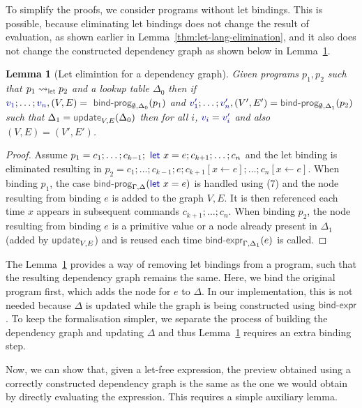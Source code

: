 \documentclass[acmsmall,anonymous,fleqn]{acmart}\settopmatter{printfolios=false,printccs=false,printacmref=false}
\newcounter{thc}
\theoremstyle{plain}
\newtheorem{lem}[thc]{Lemma}
\theoremstyle{definition}
\newcommand{\ident}[1]{\textnormal{\textcolor{idclr}{\sffamily #1}}}
\newcommand{\kvd}[1]{\textnormal{\textcolor{kvdclr}{\sffamily #1}}}
\newcommand{\bndclr}[1]{\textcolor{kvdclr}{#1}}
\begin{document}
To simplify the proofs, we consider programs without let bindings. This is possible, because
eliminating let bindings does not change the result of evaluation, as shown earlier in
Lemma~\ref{thm:let-lang-elimination}, and it also does not change the constructed dependency graph
as shown below in Lemma~\ref{thm:let-grp-elimination}.

\begin{lem}[Let elimintion for a dependency graph]
\label{thm:let-grp-elimination}
Given programs $p_1, p_2$ such that $p_1 \rightsquigarrow_\ident{let} p_2$ and a lookup table
$\Delta_0$ then if $\bndclr{v_1}; \ldots; \bndclr{v_n}, (V, E) = \ident{bind-prog}_{\emptyset, \Delta_0}(p_1)$ and
$\bndclr{v'_1};\ldots;\bndclr{v'_n}, (V', E') = \ident{bind-prog}_{\emptyset, \Delta_1}(p_2)$ such that $\Delta_1 = \ident{update}_{V, E}(\Delta_0)$
then for all $i$, $\bndclr{v_i} = \bndclr{v'_i}$ and also $(V, E) = (V', E')$.
\end{lem}
\begin{proof}
Assume $p_1 = c_1; \ldots; c_{k-1}; \kvd{let}~x=e; c_{k+1};\ldots; c_n$ and the let binding is
eliminated resulting in $p_2 = c_1; \ldots; c_{k-1}; e; c_{k+1}[x\leftarrow e];\ldots; c_n[x\leftarrow e]$.
When binding $p_1$, the case $\ident{bind-prog}_{\Gamma,\Delta}(\kvd{let}~x=e)$ is handled using (7)
and the node resulting from binding $e$ is added to the graph $V, E$. It is then referenced each
time $x$ appears in subsequent commands $c_{k+1}; \ldots; c_n$.
When binding $p_2$, the node resulting from binding $e$ is a primitive value or a node already
present in $\Delta_1$ (added by $\ident{update}_{V, E}$) and is reused each time
$\ident{bind-expr}_{\Gamma,\Delta_1}(e)$ is called.
\end{proof}

The Lemma~\ref{thm:let-grp-elimination} provides a way of removing let bindings from a program,
such that the resulting dependency graph remains the same. Here, we bind the original program
first, which adds the node for $e$ to $\Delta$. In our implementation, this is not needed
because $\Delta$ is updated while the graph is being constructed using $\ident{bind-expr}$.
To keep the formalisation simpler, we separate the process of building the dependency graph
and updating $\Delta$ and thus Lemma~\ref{thm:let-grp-elimination} requires an extra binding step.

Now, we can show that, given a let-free expression, the preview obtained using a correctly
constructed dependency graph is the same as the one we would obtain by directly evaluating the
expression. This requires a simple auxiliary lemma.
\end{document}

